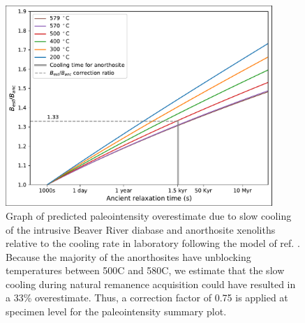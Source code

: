 \begin{figure}
\noindent\includegraphics[width=0.9\textwidth]{figure/Zhang2022/Cooling_rate_correction.pdf}
\centering
\caption{{Graph of predicted paleointensity overestimate due to slow cooling of the intrusive Beaver River diabase and anorthosite xenoliths relative to the cooling rate in laboratory following the model of ref. \citealp{Halgedahl1980a}. Because the majority of the anorthosites have unblocking temperatures between 500\textdegree C and 580\textdegree C, we estimate that the slow cooling during natural remanence acquisition could have resulted in a 33\% overestimate. Thus, a correction factor of 0.75 is applied at specimen level for the paleointensity summary plot.}}
\label{fig:PINT_cooling_corrected}
\end{figure}

\clearpage

